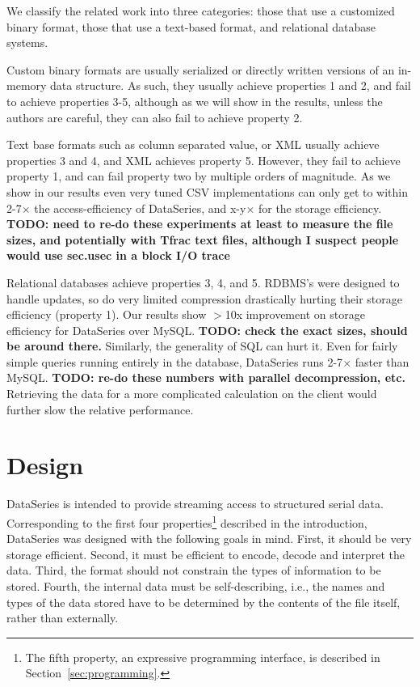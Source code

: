 \documentclass{acm_proc_article-sp}
\begin{document}
We classify the related work into three categories:
those that use a customized binary format, those that use a
text-based format, and relational database systems. 

Custom binary formats are usually serialized or directly written
versions of an in-memory data structure.  As such, they usually
achieve properties 1 and 2, and fail to achieve properties 3-5,
although as we will show in the results, unless the authors are
careful, they can also fail to achieve property 2.

Text base formats such as column separated value, or XML usually
achieve properties 3 and 4, and XML achieves property 5.  However,
they fail to achieve property 1, and can fail property two by multiple
orders of magnitude.  As we show in our results even very tuned CSV
implementations can only get to within 2-7$\times$ the
access-efficiency of DataSeries, and x-y$\times$ for the storage
efficiency.  {\bf TODO: need to re-do these experiments at least to
measure the file sizes, and potentially with Tfrac text files,
although I suspect people would use sec.usec in a block I/O trace}

Relational databases achieve properties 3, 4, and 5. RDBMS's were
designed to handle updates, so do very limited compression drastically
hurting their storage efficiency (property 1).  Our results show
$>$10x improvement on storage efficiency for DataSeries over
MySQL. {\bf TODO: check the exact sizes, should be around there.}
Similarly, the generality of SQL can hurt it.  Even for fairly simple
queries running entirely in the database, DataSeries runs 2-7$\times$
faster than MySQL. {\bf TODO: re-do these numbers with parallel
decompression, etc.}  Retrieving the data for a more complicated
calculation on the client would further slow the relative performance.

\section{Design}\label{sec:design}

DataSeries is intended to provide streaming access to structured serial
data. Corresponding
to the first four properties\footnote{The fifth property, an expressive
programming interface, is described in Section~\ref{sec:programming}.}
described in the introduction, DataSeries was designed with the
following goals in mind. First, it should be very storage
efficient. Second, it must be efficient to encode, decode and
interpret the data.  Third, the format should not constrain the
types of information to be stored. Fourth, the internal data must be
self-describing, i.e., the names and types of the data stored have to
be determined by the contents of the file itself, rather than 
externally.
\end{document}
